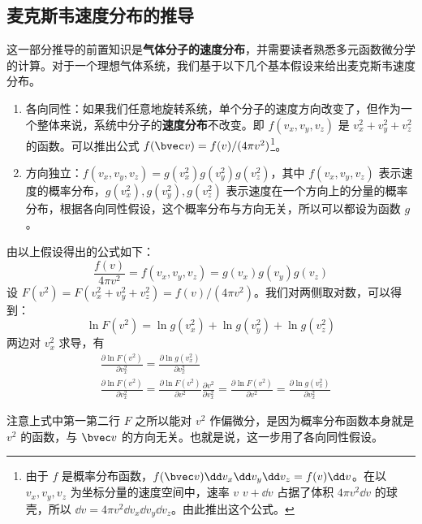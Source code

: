 \subsection{麦克斯韦速度分布的推导}
这一部分推导的前置知识是\textbf{气体分子的速度分布}，并需要读者熟悉多元函数微分学的计算。对于一个理想气体系统，我们基于以下几个基本假设来给出麦克斯韦速度分布。

\begin{enumerate}
\item 各向同性：如果我们任意地旋转系统，单个分子的速度方向改变了，但作为一个整体来说，系统中分子的\textbf{速度分布}不改变。即 $f(v_x,v_y,v_z)$ 是 $v_x^2+v_y^2+v_z^2$ 的函数。可以推出公式 $f(\bvec v)=f(v)/(4\pi v^2)$\footnote{由于 $f$ 是概率分布函数，$f(\bvec v)\dd v_x\dd v_y\dd v_z=f(v)\dd v$。在以 $v_x,v_y,v_z$ 为坐标分量的速度空间中，速率 $v\text{~}v+\dd v$ 占据了体积 $4\pi v^2\dd v$ 的球壳，所以 $\dd v=4\pi v^2 \dd v_x\dd v_y\dd v_z$。由此推出这个公式。}。

\item 方向独立：$f(v_x,v_y,v_z)=g(v_x^2)g(v_y^2)g(v_z^2)$，其中 $f(v_x,v_y,v_z)$ 表示速度的概率分布，$g(v_x^2),g(v_y^2),g(v_z^2)$ 表示速度在一个方向上的分量的概率分布，根据各向同性假设，这个概率分布与方向无关，所以可以都设为函数 $g$。
\end{enumerate}

由以上假设得出的公式如下：
\begin{equation}
\frac{f(v)}{4\pi v^2}=f(v_x,v_y,v_z)=g(v_x)g(v_y)g(v_z)
\end{equation}
设 $F(v^2)=F(v_x^2+v_y^2+v_z^2)=f(v)/(4\pi v^2)$。我们对两侧取对数，可以得到：
\begin{equation}
\ln F(v^2)=\ln g(v_x^2)+\ln g(v_y^2)+\ln g(v_z^2)
\end{equation}
两边对 $v_x^2$ 求导，有
\begin{equation}
\begin{aligned}
&\frac{\partial \ln F(v^2)}{\partial v_x^2}=\frac{\partial \ln g(v_x^2)}{\partial v_x^2}
\\
&\frac{\partial \ln F(v^2)}{\partial v_x^2}=\frac{\partial \ln F(v^2)}{\partial v^2} \frac{\partial v^2}{\partial v_x^2}=\frac{\partial \ln F(v^2)}{\partial v^2}=\frac{\partial \ln g(v_x^2)}{\partial v_x^2}
\end{aligned}
\end{equation}

注意上式中第一第二行 $F$ 之所以能对 $v^2$ 作偏微分，是因为概率分布函数本身就是 $v^2$ 的函数，与 $\bvec v$ 的方向无关。也就是说，这一步用了各向同性假设。

